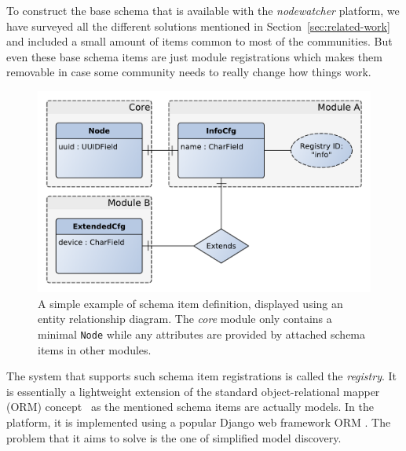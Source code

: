 \documentclass[5p,sort&compress]{elsarticle}
\newcommand{\nodewatcher}{\textit{nodewatcher}}
\begin{document}
To construct the base schema that is available with the \nodewatcher{} platform, we have surveyed all the different solutions mentioned in Section~\ref{sec:related-work} and included a small amount of items common to most of the communities.
But even these base schema items are just module registrations which makes them removable in case some community needs to really change how things work.

\begin{figure}
  \centering
  \includegraphics[scale=0.47]{figures/registry-example-models.pdf}
  \caption{A simple example of schema item definition, displayed using an entity relationship diagram.
  The \textit{core} module only contains a minimal \texttt{Node} while any attributes are provided by attached schema items in other modules.}
  \label{fig:registry-schema-example}
\end{figure}

The system that supports such schema item registrations is called the \textit{registry}.
It is essentially a lightweight extension of the standard object-relational mapper (ORM) concept~\cite{Bernstein_2007,ONeil_2008} as the mentioned schema items are actually models.
In the platform, it is implemented using a popular Django web framework ORM \cite{django_2005}.
The problem that it aims to solve is the one of simplified model discovery.
\end{document}
